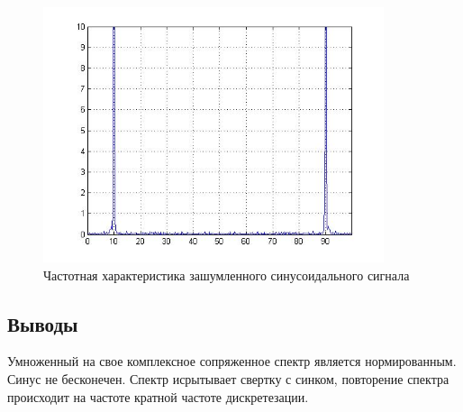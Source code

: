\documentclass[10pt,a4paper]{article}
\begin{document}
\newpage
\begin{figure}[h]
\centering
\includegraphics[width=10cm]{4.jpg} 
\caption{Частотная характеристика зашумленного синусоидального сигнала} 
\label{fig.3} 
\end{figure}

\subsection{Выводы}
\newpage
Умноженный на свое комплексное сопряженное спектр является нормированным. Синус не бесконечен. Спектр исрытывает свертку с синком, повторение спектра происходит на частоте кратной частоте дискретезации.
\end{document}
